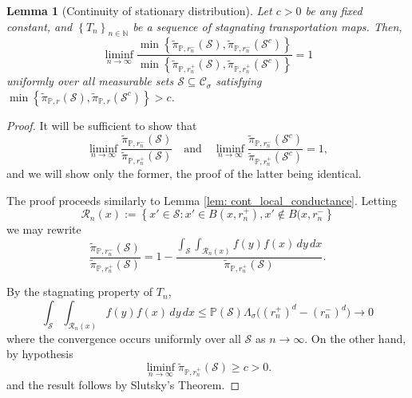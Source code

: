 \documentclass[11pt,twoside]{article}
\newtheorem{lemma}{Lemma}
\newcommand{\set}[1]{\left\{#1\right\}}
\newcommand{\seq}[1]{\left\{#1\right\}_{n \in \mathbb{N}}}
\newcommand{\1}{\mathbf{1}}
\newcommand{\Pbb}{\mathbb{P}}
\newcommand{\Sset}{\mathcal{S}}
\newcommand{\Cset}{\mathcal{C}}
\newcommand{\Csig}{\Cset_{\sigma}}
\newcommand{\dx}{\,dx}
\newcommand{\dy}{\,dy}
\newcommand{\piwt}{\widetilde{\pi}}
\begin{document}
\begin{lemma}[Continuity of stationary distribution]
	\label{lem: cont_stationary_dist}
	Let $c > 0$ be any fixed constant, and $\seq{T_n}$ be a sequence of stagnating transportation maps. Then,
	\begin{equation*}
	\liminf_{n \to \infty} \frac{\min \set{\piwt_{\Pbb,r_n^-}(\Sset), \piwt_{\Pbb,r_n^-}(\Sset^c)} }{\min \set{\piwt_{\Pbb,r_n^+}(\Sset), \piwt_{\Pbb,r_n^+}(\Sset^c)} } = 1
	\end{equation*}
	uniformly over all measurable sets $\Sset \subseteq \Csig$ satisfying $\min \set{\piwt_{\Pbb,r}(\Sset), \piwt_{\Pbb,r}(\Sset^c)}> c$. 
\end{lemma}
\begin{proof}
	It will be sufficient to show that
	\begin{equation*}
	\liminf_{n \to \infty} \frac{\piwt_{\Pbb,r_n^-}(\Sset)}{\piwt_{\Pbb,r_n^+}(\Sset)} \quad \text{and}  \quad \liminf_{n \to \infty} \frac{\piwt_{\Pbb,r_n^-}(\Sset^c)}{\piwt_{\Pbb,r_n^+}(\Sset^c)} = 1,
	\end{equation*}
	and we will show only the former, the proof of the latter being identical.
	
	The proof proceeds similarly to Lemma \ref{lem: cont_local_conductance}. Letting 
	\begin{equation*}
	\mathcal{R}_n(x) := \set{x' \in \Sset: x' \in B(x,r_n^+), x' \not\in B(x,r_n^-}
	\end{equation*}
	we may rewrite
	\begin{equation*}
	\frac{\piwt_{\Pbb,r_n^-}(\Sset)}{\piwt_{\Pbb,r_n^+}(\Sset)} = 1 - \frac{\int_{\Sset} \int_{\mathcal{R}_n(x)} f(y) f(x) \dy \dx}{\piwt_{\Pbb,r_n^+}(\Sset)}.
	\end{equation*}
	
	By the stagnating property of $T_n$,
	\begin{equation*}
	\int_{\Sset} \int_{\mathcal{R}_n(x)} f(y) f(x) \dy \dx \leq \Pbb(\Sset) \Lambda_{\sigma} \bigl( (r_n^+)^d - (r_n^-)^d\bigr) \to 0 
	\end{equation*}
	where the convergence occurs uniformly over all $\Sset$ as $n \to \infty$. On the other hand, by hypothesis
	\begin{equation*}
	\liminf_{n \to \infty} \piwt_{\Pbb,r_n^+}(\Sset) \geq c > 0.
	\end{equation*}
	and the result follows by Slutsky's Theorem. 
\end{proof}
\end{document}
